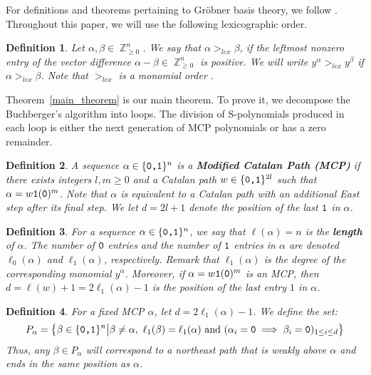 \documentclass[10pt,a4paper]{article}
\newtheorem{definition}{Definition}[section]
\DeclareMathOperator{\Z}{\mathbb{Z}}
\begin{document}
For definitions and theorems pertaining to Gr\"obner basis theory, we follow \cite{iva}.  Throughout this paper, we will use the following lexicographic order.
\begin{definition} \label{lex}
	Let $\alpha, \beta \in \Z^n_{\geq 0}$. We say that $\alpha >_{lex} \beta$, if the leftmost nonzero entry of the vector difference $\alpha - \beta \in \Z^n_{\geq 0}$ is positive. 
	We will write $y^\alpha >_{lex} y^\beta$ if $\alpha >_{lex} \beta$. Note that $>_{lex}$ is a monomial order \cite[\S2 \textemdash Proposition 4]{iva}. 
\end{definition}

Theorem~\ref{main_theorem} is our main theorem. To prove it, we decompose the Buchberger's algorithm into loops. The division of S-polynomials produced in each loop is either the next generation of MCP polynomials  or has a zero remainder.
\begin{definition}  \label{MCP}
	A sequence  $\alpha \in \{\textnormal{\texttt{0,1}}\}^n$ is a {\bf Modified Catalan Path (MCP)} if there exists integers $l,m\ge 0$ and a Catalan path $w \in \{\textnormal{\texttt{0,1}}\}^{2l}$ such that $\alpha = w\textnormal{\texttt{1}}(\textnormal{\texttt{0}})^m$.
	Note that $\alpha$ is equivalent to a Catalan path with an additional East step after its final step. We let $d=2l+1$ denote the position of the last $\textnormal{\texttt{1}}$ in $\alpha$.
\end{definition}
\begin{definition}  \label{pathlength}
	For a sequence $\alpha \in \{\textnormal{\texttt{0,1}}\}^n$, we say that $\ell(\alpha)=n$ is the {\bf length} of $\alpha$. The number of  $\textnormal{\texttt{0}}$ entries and the number of $\textnormal{\texttt{1}}$ entries in $\alpha$ are denoted $	\ell_0(\alpha)$ and $\ell_1(\alpha)$, respectively. Remark that $\ell_1(\alpha)$ is the degree of the corresponding monomial $y^{\alpha}$. Moreover, if 
	$\alpha= w\textnormal{\texttt{1}}(\textnormal{\texttt{0}})^m$ is an MCP, then 
	$d = \ell(w)+1 =2\ell_1(\alpha)-1$ is the position of the last entry $1$ in $\alpha$.
\end{definition} 
\begin{definition} \label{p_alpha}
	For a fixed MCP $\alpha$, let $d=2\ell_1(\alpha)-1$. We define the set:
	\begin{align*}
		P_{\alpha} = \big\{ \beta \in \{\textnormal{\texttt{0,1}}\}^n \big| \beta \neq \alpha,\  \ell_1(\beta)=\ell_1(\alpha) \text{ and } (\alpha_i = 
		\textnormal{\texttt{0}} \implies \beta_i = \textnormal{\texttt{0}})_{1 \leq i \leq d}\big\}
	\end{align*}
	Thus, any $\beta \in P_\alpha$ will correspond to a northeast path that is weakly above $\alpha$ and ends in the same position as $\alpha$.
\end{definition}
\end{document}
